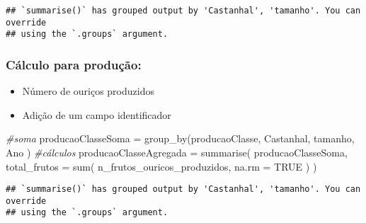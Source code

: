 \documentclass[
]{article}
\newenvironment{Shaded}{\begin{snugshade}}{\end{snugshade}}
\newcommand{\AttributeTok}[1]{\textcolor[rgb]{0.77,0.63,0.00}{#1}}
\newcommand{\CommentTok}[1]{\textcolor[rgb]{0.56,0.35,0.01}{\textit{#1}}}
\newcommand{\ConstantTok}[1]{\textcolor[rgb]{0.00,0.00,0.00}{#1}}
\newcommand{\FunctionTok}[1]{\textcolor[rgb]{0.00,0.00,0.00}{#1}}
\newcommand{\NormalTok}[1]{#1}
\newcommand{\OtherTok}[1]{\textcolor[rgb]{0.56,0.35,0.01}{#1}}
\newcommand{\SpecialCharTok}[1]{\textcolor[rgb]{0.00,0.00,0.00}{#1}}
\begin{document}
\begin{verbatim}
## `summarise()` has grouped output by 'Castanhal', 'tamanho'. You can override
## using the `.groups` argument.
\end{verbatim}

\begin{Shaded}
\end{Shaded}

\hypertarget{cuxe1lculo-para-produuxe7uxe3o}{%
\subsubsection{Cálculo para
produção:}\label{cuxe1lculo-para-produuxe7uxe3o}}

\begin{itemize}
\item
  Número de ouriços produzidos
\item
  Adição de um campo identificador
\end{itemize}

\begin{Shaded}
\begin{Highlighting}[]
\CommentTok{\#soma}
\NormalTok{producaoClasseSoma }\OtherTok{=} \FunctionTok{group\_by}\NormalTok{(producaoClasse, Castanhal, tamanho, Ano )}
\CommentTok{\#cálculos}
\NormalTok{producaoClasseAgregada }\OtherTok{=} \FunctionTok{summarise}\NormalTok{(}
\NormalTok{    producaoClasseSoma,}
    \AttributeTok{total\_frutos =} \FunctionTok{sum}\NormalTok{(}
\NormalTok{        n\_frutos\_ouricos\_produzidos,}
        \AttributeTok{na.rm =} \ConstantTok{TRUE}
\NormalTok{    )}
\NormalTok{)}
\end{Highlighting}
\end{Shaded}

\begin{verbatim}
## `summarise()` has grouped output by 'Castanhal', 'tamanho'. You can override
## using the `.groups` argument.
\end{verbatim}
\end{document}

